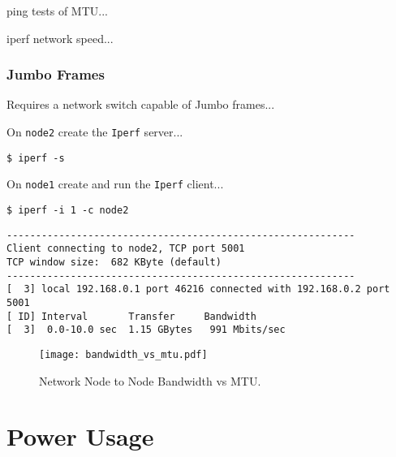 ping tests of MTU...




iperf network speed...





\subsubsection{Jumbo Frames}

Requires a network switch capable of Jumbo frames...


On \verb|node2| create the \verb|Iperf| server...

\lstset{style=type}
\begin{lstlisting}
$ iperf -s
\end{lstlisting}

On \verb|node1| create and run the \verb|Iperf| client...

\lstset{style=type}
\begin{lstlisting}
$ iperf -i 1 -c node2
\end{lstlisting}

\lstset{style=type}
\begin{lstlisting}
------------------------------------------------------------
Client connecting to node2, TCP port 5001
TCP window size:  682 KByte (default)
------------------------------------------------------------
[  3] local 192.168.0.1 port 46216 connected with 192.168.0.2 port 5001
[ ID] Interval       Transfer     Bandwidth
[  3]  0.0-10.0 sec  1.15 GBytes   991 Mbits/sec
\end{lstlisting}


\begin{figure}
	\centering	
	\texttt{[image: bandwidth\_vs\_mtu.pdf]}
	\caption{Network Node to Node Bandwidth vs MTU.}
\end{figure}



%
%
\section{Power Usage}

